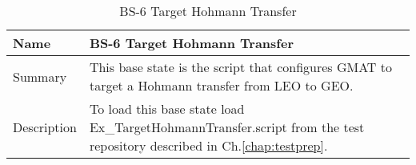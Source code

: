 \begin{table}[htbp!]
\centering
      \begin{tabular}{|p{1.05 in} |p{4.75 in} |}
      \hline
         \rowcolor[rgb]{0.8,0.8,0.8} Name & BS-6 Target Hohmann Transfer \\
         \hline
         Summary &
         This base state is the script that configures GMAT to target a Hohmann transfer from LEO to GEO.
         \\ \hline
         Description &
          To load this base state load Ex\_TargetHohmannTransfer.script from the test repository described in Ch.\ref{chap:testprep}.
         \\ \hline
\end{tabular}
      \label{Table: BS-6}
      \caption{BS-6 Target Hohmann Transfer }
\end{table}
